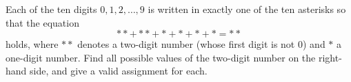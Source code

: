 Each of the ten digits $0,1,2,\dots,9$ is written in exactly one of the ten asterisks so that the equation
\[
**+**+*+*+*+*=**
\]
holds, where $**$ denotes a two-digit number (whose first digit is not $0$) and $*$ a one-digit number. Find all possible values of the two-digit number on the right-hand side, and give a valid assignment for each.
